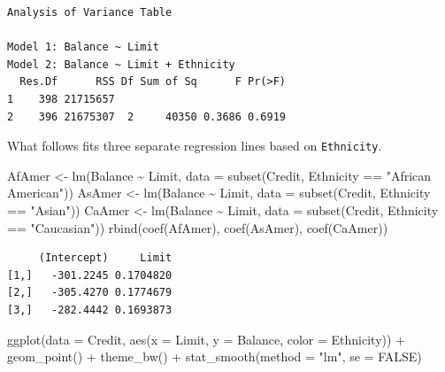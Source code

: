 \documentclass[
]{article}
\newenvironment{Shaded}{\begin{snugshade}}{\end{snugshade}}
\newcommand{\AttributeTok}[1]{\textcolor[rgb]{0.77,0.63,0.00}{#1}}
\newcommand{\ConstantTok}[1]{\textcolor[rgb]{0.00,0.00,0.00}{#1}}
\newcommand{\FunctionTok}[1]{\textcolor[rgb]{0.00,0.00,0.00}{#1}}
\newcommand{\NormalTok}[1]{#1}
\newcommand{\OtherTok}[1]{\textcolor[rgb]{0.56,0.35,0.01}{#1}}
\newcommand{\SpecialCharTok}[1]{\textcolor[rgb]{0.00,0.00,0.00}{#1}}
\newcommand{\StringTok}[1]{\textcolor[rgb]{0.31,0.60,0.02}{#1}}
\begin{document}
\begin{verbatim}
Analysis of Variance Table

Model 1: Balance ~ Limit
Model 2: Balance ~ Limit + Ethnicity
  Res.Df      RSS Df Sum of Sq      F Pr(>F)
1    398 21715657                           
2    396 21675307  2     40350 0.3686 0.6919
\end{verbatim}

What follows fits three separate regression lines based on \texttt{Ethnicity}.

\begin{Shaded}
\begin{Highlighting}[]
\NormalTok{AfAmer }\OtherTok{\textless{}{-}} \FunctionTok{lm}\NormalTok{(Balance }\SpecialCharTok{\textasciitilde{}}\NormalTok{ Limit, }\AttributeTok{data =} \FunctionTok{subset}\NormalTok{(Credit, Ethnicity }\SpecialCharTok{==} \StringTok{"African American"}\NormalTok{))}
\NormalTok{AsAmer }\OtherTok{\textless{}{-}} \FunctionTok{lm}\NormalTok{(Balance }\SpecialCharTok{\textasciitilde{}}\NormalTok{ Limit, }\AttributeTok{data =} \FunctionTok{subset}\NormalTok{(Credit, Ethnicity }\SpecialCharTok{==} \StringTok{"Asian"}\NormalTok{))}
\NormalTok{CaAmer }\OtherTok{\textless{}{-}} \FunctionTok{lm}\NormalTok{(Balance }\SpecialCharTok{\textasciitilde{}}\NormalTok{ Limit, }\AttributeTok{data =} \FunctionTok{subset}\NormalTok{(Credit, Ethnicity }\SpecialCharTok{==} \StringTok{"Caucasian"}\NormalTok{))}
\FunctionTok{rbind}\NormalTok{(}\FunctionTok{coef}\NormalTok{(AfAmer), }\FunctionTok{coef}\NormalTok{(AsAmer), }\FunctionTok{coef}\NormalTok{(CaAmer))}
\end{Highlighting}
\end{Shaded}

\begin{verbatim}
     (Intercept)     Limit
[1,]   -301.2245 0.1704820
[2,]   -305.4270 0.1774679
[3,]   -282.4442 0.1693873
\end{verbatim}

\begin{Shaded}
\begin{Highlighting}[]
\FunctionTok{ggplot}\NormalTok{(}\AttributeTok{data =}\NormalTok{ Credit, }\FunctionTok{aes}\NormalTok{(}\AttributeTok{x =}\NormalTok{ Limit, }\AttributeTok{y =}\NormalTok{ Balance, }\AttributeTok{color =}\NormalTok{ Ethnicity)) }\SpecialCharTok{+}
  \FunctionTok{geom\_point}\NormalTok{() }\SpecialCharTok{+} 
  \FunctionTok{theme\_bw}\NormalTok{() }\SpecialCharTok{+}
  \FunctionTok{stat\_smooth}\NormalTok{(}\AttributeTok{method =} \StringTok{"lm"}\NormalTok{, }\AttributeTok{se =} \ConstantTok{FALSE}\NormalTok{)}
\end{Highlighting}
\end{Shaded}
\end{document}

